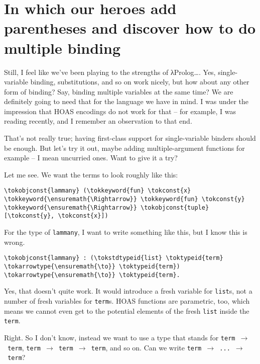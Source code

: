 \section{In which our heroes add parentheses and discover how to do
multiple
binding}\label{in-which-our-heroes-add-parentheses-and-discover-how-to-do-multiple-binding}

\heroSTUDENT{} Still, I feel like we've been playing to the strengths of
\foreignlanguage{greek}{λ}Prolog\ldots{}. Yes, single-variable binding, substitutions, and so on
work nicely, but how about any other form of binding? Say, binding
multiple variables at the same time? We are definitely going to need
that for the language we have in mind. I was under the impression that
HOAS encodings do not work for that -- for example, I was reading
\citet{keuchel2016needle} recently, and I remember an observation to
that end.

\heroADVISOR{} That's not really true; having first-class support for
single-variable binders should be enough. But let's try it out, maybe
adding multiple-argument functions for example -- I mean uncurried ones.
Want to give it a try?

\heroSTUDENT{} Let me see. We want the terms to look roughly like this:

\begin{verbatim}
\tokobjconst{lammany} (\tokkeyword{fun} \tokconst{x} \tokkeyword{\ensuremath{\Rightarrow}} \tokkeyword{fun} \tokconst{y} \tokkeyword{\ensuremath{\Rightarrow}} \tokobjconst{tuple} [\tokconst{y}, \tokconst{x}])
\end{verbatim}

For the type of \texttt{lammany}, I want to write something like this,
but I know this is wrong.

\begin{verbatim}
\tokobjconst{lammany} : (\tokstdtypeid{list} \toktypeid{term} \tokarrowtype{\ensuremath{\to}} \toktypeid{term}) \tokarrowtype{\ensuremath{\to}} \toktypeid{term}.
\end{verbatim}

\heroADVISOR{} Yes, that doesn't quite work. It would introduce a fresh
variable for \texttt{list}s, not a number of fresh variables for
\texttt{term}s. HOAS functions are parametric, too, which means we
cannot even get to the potential elements of the fresh \texttt{list}
inside the \texttt{term}.

\heroSTUDENT{} Right. So I don't know, instead we want to use a type that
stands for \texttt{term\ \ensuremath{\to}\ term},
\texttt{term\ \ensuremath{\to}\ term\ \ensuremath{\to}\ term}, and so on.
Can we write \texttt{term\ \ensuremath{\to}\ ...\ \ensuremath{\to}\ term}?

